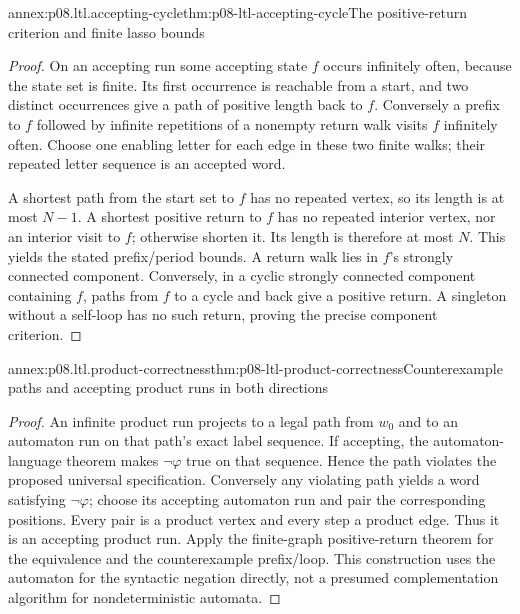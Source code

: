 \begin{annexitem}{annex:p08.ltl.accepting-cycle}{thm:p08-ltl-accepting-cycle}{The positive-return criterion and finite lasso bounds}
\begin{proof}
On an accepting run some accepting state \(f\) occurs infinitely
often, because the state set is finite. Its first occurrence
is reachable from a start, and two distinct occurrences give
a path of positive length back to \(f\). Conversely a
prefix to \(f\) followed by infinite repetitions of a
nonempty return walk visits \(f\) infinitely often. Choose
one enabling letter for each edge in these two finite walks;
their repeated letter sequence is an accepted word.

A shortest path from the start set to \(f\) has no repeated
vertex, so its length is at most \(N-1\). A shortest positive
return to \(f\) has no repeated interior vertex, nor an
interior visit to \(f\); otherwise shorten it. Its length is
therefore at most \(N\). This yields the stated prefix/period
bounds. A return walk lies in \(f\)'s strongly connected
component. Conversely, in a cyclic strongly connected component
containing \(f\), paths from \(f\) to a cycle and back give
a positive return. A singleton without a self-loop has no
such return, proving the precise component criterion.
\end{proof}
\end{annexitem}

\begin{annexitem}{annex:p08.ltl.product-correctness}{thm:p08-ltl-product-correctness}{Counterexample paths and accepting product runs in both directions}
\begin{proof}
An infinite product run projects to a legal path from \(w_0\)
and to an automaton run on that path's exact label sequence.
If accepting, the automaton-language theorem makes
\(\neg\varphi\) true on that sequence. Hence the path
violates the proposed universal specification. Conversely any
violating path yields a word satisfying \(\neg\varphi\);
choose its accepting automaton run and pair the corresponding
positions. Every pair is a product vertex and every step a
product edge. Thus it is an accepting product run. Apply the
finite-graph positive-return theorem for the equivalence and
the counterexample prefix/loop. This construction uses the
automaton for the syntactic negation directly, not a presumed
complementation algorithm for nondeterministic automata.
\end{proof}
\end{annexitem}

